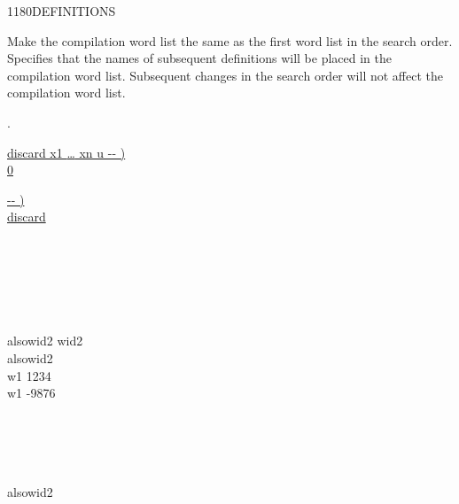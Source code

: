 \begin{worddef}{1180}{DEFINITIONS}
\item \stack{}{}

	Make the compilation word list the same as the first word list
	in the search order. Specifies that the names of subsequent
	definitions will be placed in the compilation word list.
	Subsequent changes in the search order will not affect the
	compilation word list.

\see {}.

	\begin{implement}
\cbstart{}
		\uline{\word{:} discard  x1 {\ldots} xn u -{}- ) \bs{} } \\
		\tab \uline{0   } \\
		\uline{\word{;}}

		\uline{\word{:}   -{}- )} \\
		\tab \uline{    discard} \\
		\uline{\word{;}}
\cbend
	\end{implement}

	\begin{testing}\ttfamily
		 \\

		 \\
		 \\
		 \\

		\word{:} alsowid2   wid2      \word{;} \\
		alsowid2 \\
		\word{:} w1 1234 \word{;} \\
		\word{:} w1 -9876 \word{;} 

		  \\
		 \\
		 \\
		 \\
		alsowid2 \\
		 \\


\end{testing}
\end{worddef}
